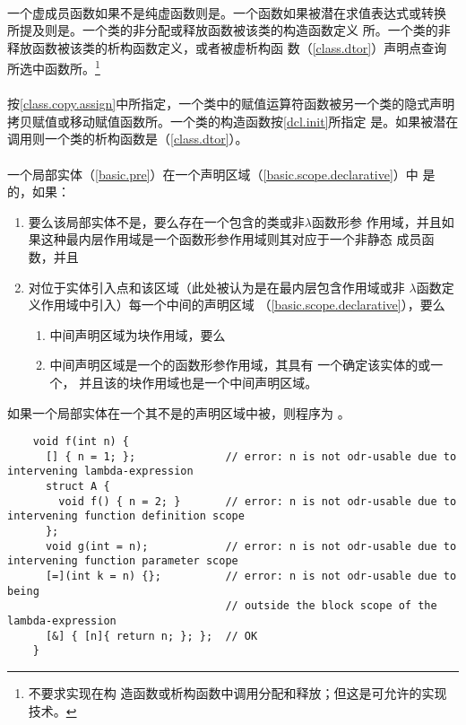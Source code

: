 \paragraph{} %
一个虚成员函数如果不是纯虚函数则是\odrused{}。一个函数如果被潜在求值表达式或转换
所提及则是\odrused{}。一个类的非\placement{}分配或释放函数被该类的构造函数定义
所\odruse{}。一个类的非\placement{}释放函数被该类的析构函数定义，或者被虚析构函
数（\ref{class.dtor}）声明点查询所选中函数所\odruse{}。\footnote{不要求实现在构
造函数或析构函数中调用分配和释放；但这是可允许的实现技术。}

\paragraph{} %
按\ref{class.copy.assign}中所指定，一个类中的赋值运算符函数被另一个类的隐式声明
拷贝赋值或移动赋值函数所\odruse{}。一个类的构造函数按\ref{dcl.init}所指定
是\odrused{}。如果被潜在调用则一个类的析构函数是\odrused{}（\ref{class.dtor}）。

\paragraph{} %
一个局部实体（\ref{basic.pre}）在一个声明区域（\ref{basic.scope.declarative}）中
是\odrusable{}的，如果：
\begin{enumerate}
  \item 要么该局部实体不是，要么存在一个包含的类或非$\lambda$函数形参
        作用域，并且如果这种最内层作用域是一个函数形参作用域则其对应于一个非静态
        成员函数，并且
  \item 对位于实体引入点和该区域（此处被认为是在最内层包含作用域或非
        $\lambda$函数定义作用域中引入）每一个中间的声明区域
        （\ref{basic.scope.declarative}），要么
        \begin{enumerate}
          \item 中间声明区域为块作用域，要么
          \item 中间声明区域是一个的函数形参作用域，其具有
                一个确定该实体的或一个，
                并且该的块作用域也是一个中间声明区域。
        \end{enumerate}
\end{enumerate}
如果一个局部实体在一个其不是\odrusable{}的声明区域中被\odruse{}，则程序为
\illform{}。

\begin{example} %
  \begin{lstlisting}
    void f(int n) {
      [] { n = 1; };              // error: n is not odr-usable due to intervening lambda-expression
      struct A {
        void f() { n = 2; }       // error: n is not odr-usable due to intervening function definition scope
      };
      void g(int = n);            // error: n is not odr-usable due to intervening function parameter scope
      [=](int k = n) {};          // error: n is not odr-usable due to being
                                  // outside the block scope of the lambda-expression
      [&] { [n]{ return n; }; };  // OK
    }
  \end{lstlisting}
\end{example}

